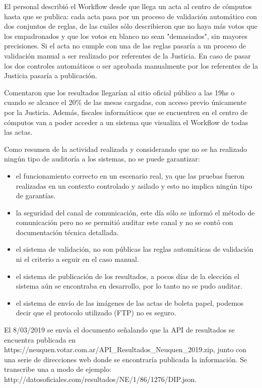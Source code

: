 El personal describió el Workflow desde que llega un acta al centro de cómputos hasta que se publica: cada acta pasa por un proceso de validación automático con dos conjuntos de reglas, de las cuáles sólo describieron que no haya más votos que los empadronados y que los votos en blanco no sean "demasiados", sin mayores precisiones. Si el acta no cumple con una de las reglas pasaría a un proceso de validación manual a ser realizado por referentes de la Justicia. En caso de pasar los dos controles automáticos o ser aprobada manualmente por los referentes de la Justicia pasaría a publicación.

Comentaron que los resultados llegarían al sitio oficial público a las 19hs o cuando se alcance el 20\% de las mesas cargadas, con acceso previo únicamente por la Justicia. Además, fiscales informáticos que se encuentren en el centro de cómputos van a poder acceder a un sistema que visualiza el Workflow de todas las actas.

Como resumen de la actividad realizada y considerando que no se ha realizado ningún tipo de auditoría a los sistemas, no se puede garantizar:

\begin{itemize}
    \item el funcionamiento correcto en un escenario real, ya que las pruebas fueron realizadas en un contexto controlado y asilado y esto no implica ningún tipo de garantías.
    \item la seguridad del canal de comunicación, este día sólo se informó el método de comunicación pero no se permitió auditar este canal y no se contó con documentación técnica detallada.
    \item el sistema de validación, no son públicas las reglas automáticas de validación ni el criterio a seguir en el caso manual.
    \item el sistema de publicación de los resultados, a pocos días de la elección el sistema aún se encontraba en desarrollo, por lo tanto no se pudo auditar.
    \item el sistema de envío de las imágenes de las actas de boleta papel, podemos decir que el protocolo utilizado (FTP) no es seguro.
\end{itemize}

El 8/03/2019 se envía el documento señalando que la API de resultados se encuentra publicada en https://neuquen.votar.com.ar/API\_Resultados\_Neuquen\_2019.zip, junto con una serie de direcciones web donde se encontraría publicada la información. Se transcribe una a modo de ejemplo: http://datosoficiales.com/resultados/NE/1/86/1276/DIP.json. 

